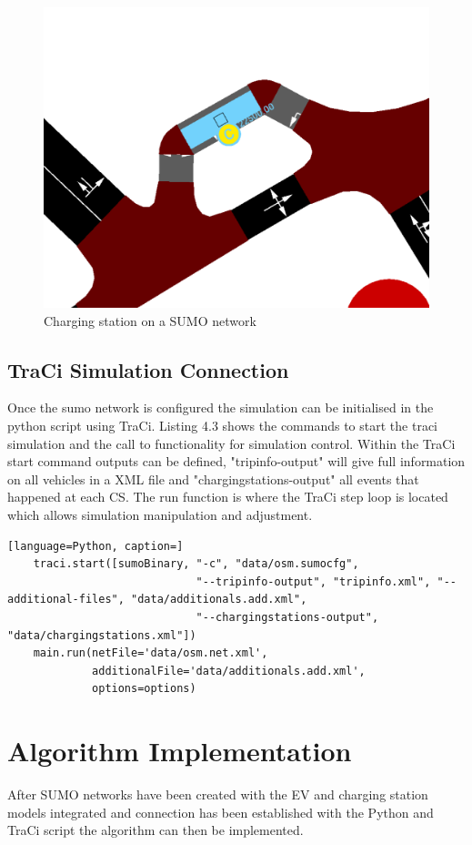 \documentclass[11pt]{report}
\begin{document}
\begin{figure}[h!]
  \centering
  \includegraphics[width=0.7\linewidth]{sumoCS.PNG}
  \caption{Charging station on a SUMO network}
  \label{fig:8}
\end{figure}

\subsection{TraCi Simulation Connection}

Once the sumo network is configured the simulation can be initialised in the python script using TraCi. Listing 4.3 shows the commands to start the traci simulation and the call to functionality for simulation control. Within the TraCi start command outputs can be defined, "tripinfo-output" will give full information on all vehicles in a XML file and "chargingstations-output" all events that happened at each CS. The run function is where the TraCi step loop is located which allows simulation manipulation and adjustment.

\begin{lstlisting}[language=Python, caption=]
    traci.start([sumoBinary, "-c", "data/osm.sumocfg",
                             "--tripinfo-output", "tripinfo.xml", "--additional-files", "data/additionals.add.xml",
                             "--chargingstations-output", "data/chargingstations.xml"])
    main.run(netFile='data/osm.net.xml',
             additionalFile='data/additionals.add.xml',
             options=options)
\end{lstlisting}

\section{Algorithm Implementation}

After SUMO networks have been created with the EV and charging station models integrated and connection has been established with the Python and TraCi script the algorithm can then be implemented. 
\end{document}
